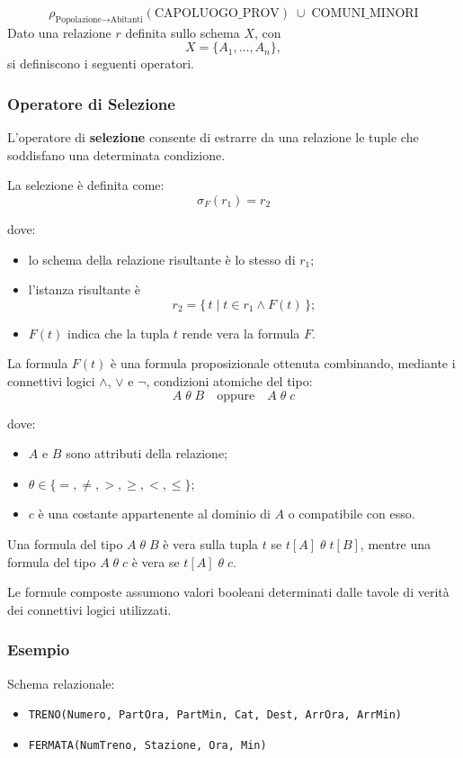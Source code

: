 \[
\rho_{\text{Popolazione} \rightarrow \text{Abitanti}}
(\text{CAPOLUOGO\_PROV}) \;\cup\; \text{COMUNI\_MINORI}
\]
Dato una relazione $r$ definita sullo schema $X$, con
\[
X = \{A_1, \dots, A_n\},
\]
si definiscono i seguenti operatori.
\subsubsection{Operatore di Selezione}
L'operatore di \textbf{selezione} consente di estrarre da una relazione le tuple
che soddisfano una determinata condizione.

La selezione è definita come:
\[
\sigma_F(r_1) = r_2
\]

dove:
\begin{itemize}
	\item lo schema della relazione risultante è lo stesso di $r_1$;
	\item l'istanza risultante è
	\[
	r_2 = \{\, t \mid t \in r_1 \land F(t) \,\};
	\]
	\item $F(t)$ indica che la tupla $t$ rende vera la formula $F$.
\end{itemize}

La formula $F(t)$ è una formula proposizionale ottenuta combinando,
mediante i connettivi logici $\land$, $\lor$ e $\neg$, condizioni
atomiche del tipo:
\[
A \; \theta \; B \quad \text{oppure} \quad A \; \theta \; c
\]

dove:
\begin{itemize}
	\item $A$ e $B$ sono attributi della relazione;
	\item $\theta \in \{=, \neq, >, \ge, <, \le\}$;
	\item $c$ è una costante appartenente al dominio di $A$ o compatibile
	con esso.
\end{itemize}

Una formula del tipo $A \; \theta \; B$ è vera sulla tupla $t$ se
$t[A] \; \theta \; t[B]$, mentre una formula del tipo
$A \; \theta \; c$ è vera se $t[A] \; \theta \; c$.

Le formule composte assumono valori booleani determinati dalle tavole di
verità dei connettivi logici utilizzati.
\subsubsection*{Esempio}

Schema relazionale:
\begin{itemize}
	\item \texttt{TRENO(Numero, PartOra, PartMin, Cat, Dest, ArrOra, ArrMin)}
	\item \texttt{FERMATA(NumTreno, Stazione, Ora, Min)}
\end{itemize}

